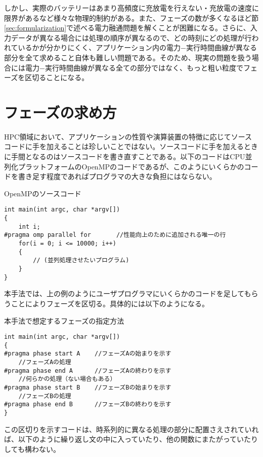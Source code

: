 しかし、実際のバッテリーはあまり高頻度に充放電を行えない・充放電の速度に限界があるなど様々な物理的制約がある。また、フェーズの数が多くなるほど節\ref{sec:formularization}で述べる電力融通問題を解くことが困難になる。さらに、入力データが異なる場合には処理の順序が異なるので、どの時刻にどの処理が行われているかが分かりにくく、アプリケーション内の電力−実行時間曲線が異なる部分を全て求めること自体も難しい問題である。そのため、現実の問題を扱う場合には電力−実行時間曲線が異なる全ての部分ではなく、もっと粗い粒度でフェーズを区切ることになる。

\section{フェーズの求め方}
\label{sec:phase2}

HPC領域において、アプリケーションの性質や演算装置の特徴に応じてソースコードに手を加えることは珍しいことではない。ソースコードに手を加えるときに手間となるのはソースコードを書き直すことである。以下のコードはCPU並列化プラットフォームのOpenMPのコードであるが、このようにいくらかのコードを書き足す程度であればプログラマの大きな負担にはならない。

{\small
\begin{itembox}[c]{OpenMPのソースコード}
\begin{verbatim}
int main(int argc, char *argv[])
{
    int i;
#pragma omp parallel for       //性能向上のために追加される唯一の行
    for(i = 0; i <= 10000; i++)
    {
        // (並列処理させたいプログラム)
    }
}
\end{verbatim}
\end{itembox}}

本手法では、上の例のようにユーザプログラマにいくらかのコードを足してもらうことによりフェーズを区切る。具体的には以下のようになる。

{\small
\begin{itembox}[c]{本手法で想定するフェーズの指定方法}
\begin{verbatim}
int main(int argc, char *argv[])
{
#pragma phase start A    //フェーズAの始まりを示す
    //フェーズAの処理
#pragma phase end A      //フェーズAの終わりを示す
    //何らかの処理（ない場合もある）
#pragma phase start B    //フェーズBの始まりを示す
    //フェーズBの処理
#pragma phase end B      //フェーズBの終わりを示す
}
\end{verbatim}
\end{itembox}}

この区切りを示すコードは、時系列的に異なる処理の部分に配置さえされていれば、以下のように繰り返し文の中に入っていたり、他の関数にまたがっていたりしても構わない。

